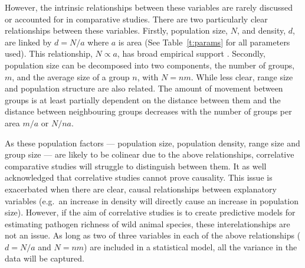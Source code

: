 
However, the intrinsic relationships between these variables are rarely discussed or accounted for in comparative studies.
There are two particularly clear relationships between these variables.
Firstly, population size, $N$, and density, $d$, are linked by $d = N/a$ where $a$ is area (See Table~\ref{t:params} for all parameters used).
This relationship, $N \propto a$, has broad empirical support \cite{blackburn2006variations, borregaard2010causality}.
Secondly, population size can be decomposed into two components, the number of groups, $m$, and the average size of a group $n$, with $N = nm$.
While less clear, range size and population structure are also related.
The amount of movement between groups is at least partially dependent on the distance between them \cite{jenkins2010meta, le2012patterns, schooley2009enhancing} and the distance between neighbouring groups decreases with the number of groups per area $m/a$ or $N/na$.






As these population factors --- population size, population density, range size and group size --- are likely to be colinear due to the above relationships, correlative comparative studies will struggle to distinguish between them.
It as well acknowledged that correlative studies cannot prove causality.
This issue is exacerbated when there are clear, causal relationships between explanatory variables (e.g.\ an increase in density will directly cause an increase in population size).
However, if the aim of correlative studies is to create predictive models for estimating pathogen richness of wild animal species, these interelationships are not an issue.
As long as two of three variables in each of the above relationships ($d = N/a$ and $N = nm$) are included in a statistical model, all the variance in the data will be captured.


